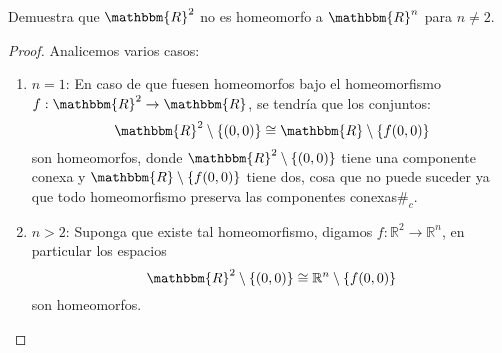 \documentclass[12pt]{report}
\newcounter{it}
\theoremstyle{largebreak}
\newcommand\cf[3]{\ensuremath{#1:#2\rightarrow#3}}
\newcommand\contradiction{\ensuremath{\#_c}}
\newcommand{\bbm}[1]{\ensuremath{\mathbbm{#1}}}
\begin{document}
    \begin{excer}
        Demuestra que $\bbm{R}^2$ no es homeomorfo a $\bbm{R}^n$ para $n\neq 2$.
    \end{excer}

    \begin{proof}
        Analicemos varios casos:
        \begin{enumerate}[label = \textit{(\arabic*)}]
            \item $n=1$: En caso de que fuesen homeomorfos bajo el homeomorfismo $\cf{f}{\bbm{R}^2}{\bbm{R}}$, se tendría que los conjuntos:
            \begin{equation*}
                \bbm{R}^2\setminus\left\{(0,0)\right\}\cong\bbm{R}\setminus\left\{f(0,0)\right\}
            \end{equation*}
            son homeomorfos, donde $\bbm{R}^2\setminus\left\{(0,0)\right\}$ tiene una componente conexa y $\bbm{R}\setminus\left\{f(0,0)\right\}$ tiene dos, cosa que no puede suceder ya que todo homeomorfismo preserva las componentes conexas\contradiction.
            \item $n>2$: Suponga que existe tal homeomorfismo, digamos $\cf{f}{\mathbb{R}^2}{\mathbb{R}^n}$, en particular los espacios
            \begin{equation*}
                \bbm{R}^2\setminus\left\{(0,0)\right\}\cong\mathbb{R}^n\setminus\left\{f(0,0)\right\}
            \end{equation*}
            son homeomorfos.


\end{enumerate}
\end{proof}
\end{document}
